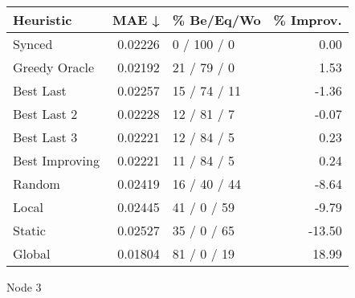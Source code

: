 \begin{tabular}{lrlr}
\toprule
\textbf{Heuristic} & \textbf{MAE ↓} & \textbf{\% Be/Eq/Wo} & \textbf{\% Improv.} \\
\midrule
            Synced &        0.02226 &          0 / 100 / 0 &                0.00 \\
     Greedy Oracle &        0.02192 &          21 / 79 / 0 &                1.53 \\
         Best Last &        0.02257 &         15 / 74 / 11 &               -1.36 \\
       Best Last 2 &        0.02228 &          12 / 81 / 7 &               -0.07 \\
       Best Last 3 &        0.02221 &          12 / 84 / 5 &                0.23 \\
    Best Improving &        0.02221 &          11 / 84 / 5 &                0.24 \\
            Random &        0.02419 &         16 / 40 / 44 &               -8.64 \\
             Local &        0.02445 &          41 / 0 / 59 &               -9.79 \\
            Static &        0.02527 &          35 / 0 / 65 &              -13.50 \\
            Global &        0.01804 &          81 / 0 / 19 &               18.99 \\
\bottomrule
\end{tabular}
\caption{Node 3}
\label{tab:iid_lr05_le1_bs2_3}
